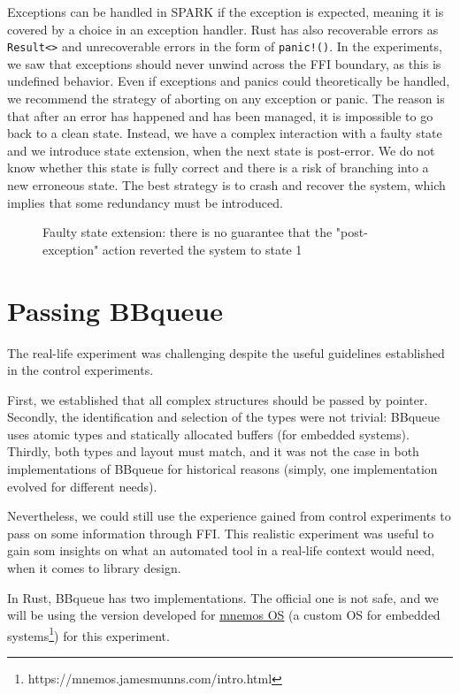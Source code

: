 \documentclass[nomenclature, english, bibtex]{kththesis}
\newcommand{\inlinecode}[1]{\texttt{#1}}
\begin{document}
Exceptions can be handled in SPARK if the exception is expected, meaning it is covered by a choice in an exception handler. 
Rust has also recoverable errors as \inlinecode{Result<>} and unrecoverable errors in the form of \inlinecode{panic!()}. In the experiments, we saw that exceptions should never unwind across the FFI boundary, as this is undefined behavior. Even if exceptions and panics could theoretically be handled, we recommend the strategy of aborting on any exception or panic. The reason is that after an error has happened and has been managed, it is impossible to go back to a clean state. Instead, we have a complex interaction with a faulty state and we introduce state extension, when the next state is post-error. We do not know whether this state is fully correct and there is a risk of branching into a new erroneous state. The best strategy is to crash and recover the system, which implies that some redundancy must be introduced.

\begin{figure}[ht!]
  \centering 

\caption[Faulty state extension]{Faulty state extension: there is no guarantee that the "post-exception" action reverted the system to state 1}
\end{figure}
\FloatBarrier

\section{Passing BBqueue}

The real-life experiment was challenging despite the useful guidelines established in the control experiments.

First, we established that all complex structures should be passed by pointer.
Secondly, the identification and selection of the types were not trivial: BBqueue uses atomic types and statically allocated buffers (for embedded systems).
Thirdly, both types and layout must match, and it was not the case in both implementations of BBqueue for historical reasons (simply, one implementation evolved for different needs).

Nevertheless, we could still use the experience gained from control experiments to pass on some information through FFI. This realistic experiment was useful to gain som insights on what an automated tool in a real-life context would need, when it comes to library design.

In Rust, BBqueue has two implementations. The official one is not  safe, and we will be using the version developed for \href{https://github.com/tosc-rs/mnemos/tree/main/source/abi/src/bbqueue_ipc}{mnemos OS} (a custom OS for embedded systems\footnote{https://mnemos.jamesmunns.com/intro.html}) for this experiment.  
\end{document}
